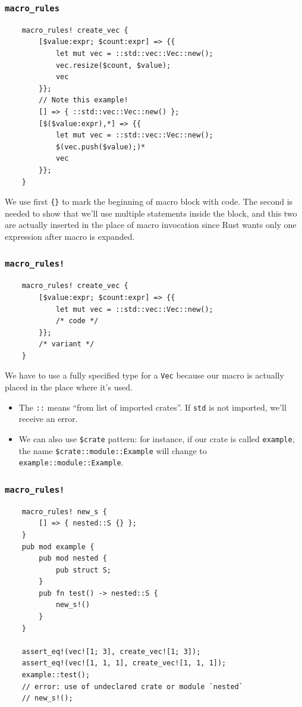 \documentclass[aspectratio=1610,t]{beamer}
\begin{document}
\begin{frame}[fragile]
\frametitle{\texttt{macro\_rules}}
\begin{verbatim}
    macro_rules! create_vec {
        [$value:expr; $count:expr] => {{
            let mut vec = ::std::vec::Vec::new();
            vec.resize($count, $value);
            vec
        }};
        // Note this example!
        [] => { ::std::vec::Vec::new() };
        [$($value:expr),*] => {{
            let mut vec = ::std::vec::Vec::new();
            $(vec.push($value);)*
            vec
        }};
    }
\end{verbatim}

We use first \texttt{\{\}} to mark the beginning of macro block with code. The second is needed to show that we'll use multiple statements inside the block, and this two are actually inserted in the place of macro invocation since Rust wants only one expression after macro is expanded.
\end{frame}


\begin{frame}[fragile]
\frametitle{\texttt{macro\_rules!}}
\begin{verbatim}
    macro_rules! create_vec {
        [$value:expr; $count:expr] => {{
            let mut vec = ::std::vec::Vec::new();
            /* code */
        }};
        /* variant */
    }
\end{verbatim}

We have to use a fully specified type for a \texttt{Vec} because our macro is actually placed in the place where it's used.

\begin{itemize}
    \item<2-> The \texttt{::} means ``from list of imported crates''. If \texttt{std} is not imported, we'll receive an error.
    \item<3-> We can also use \texttt{\$crate} pattern: for instance, if our crate is called \texttt{example}, the name \texttt{\$crate::module::Example} will change to \texttt{example::module::Example}.
\end{itemize}
\end{frame}


\begin{frame}[fragile]
\frametitle{\texttt{macro\_rules!}}
\begin{verbatim}
    macro_rules! new_s {
        [] => { nested::S {} };
    }
    pub mod example {
        pub mod nested {
            pub struct S;
        }
        pub fn test() -> nested::S {
            new_s!()
        }
    }

    assert_eq!(vec![1; 3], create_vec![1; 3]);
    assert_eq!(vec![1, 1, 1], create_vec![1, 1, 1]);
    example::test();
    // error: use of undeclared crate or module `nested`
    // new_s!();
\end{verbatim}
\end{frame}
\end{document}
